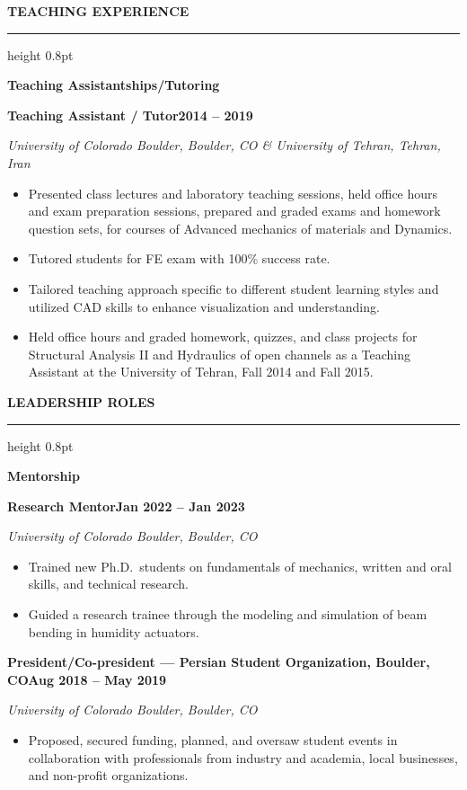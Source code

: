 \documentclass[10pt, letterpaper]{article}
\newcommand{\rsection}[1]{%
  \vspace{8pt}%
  {\large\bfseries\MakeUppercase{#1}}%
  \vspace{1pt}%
  \hrule height 0.8pt%
  \vspace{4pt}%
}
\newcommand{\jobline}[2]{%
  \vspace{5pt}%
  \noindent\textbf{#1}\hfill\textbf{#2}\par%
  \vspace{1pt}%
}
\newcommand{\subline}[1]{%
  \vspace{-1pt}%
  \noindent\textit{#1}\par%
  \vspace{1pt}%
}
\newenvironment{rlist}{%
  \begin{itemize}[leftmargin=1.4em, itemsep=1pt, topsep=2pt, parsep=0pt]%
}{%
  \end{itemize}%
}
\begin{document}
\rsection{Teaching Experience}

\noindent\textbf{Teaching Assistantships/Tutoring}

\jobline{Teaching Assistant / Tutor}{2014 -- 2019}
\subline{University of Colorado Boulder, Boulder, CO \& University of Tehran, Tehran, Iran}
\begin{rlist}
  \item Presented class lectures and laboratory teaching sessions, held office hours and exam preparation sessions, prepared and graded exams and homework question sets, for courses of Advanced mechanics of materials and Dynamics.
  \item Tutored students for FE exam with 100\% success rate.
  \item Tailored teaching approach specific to different student learning styles and utilized CAD skills to enhance visualization and understanding.
  \item Held office hours and graded homework, quizzes, and class projects for Structural Analysis II and Hydraulics of open channels as a Teaching Assistant at the University of Tehran, Fall 2014 and Fall 2015.
\end{rlist}

\rsection{Leadership Roles}

\noindent\textbf{Mentorship}

\jobline{Research Mentor}{Jan 2022 -- Jan 2023}
\subline{University of Colorado Boulder, Boulder, CO}
\begin{rlist}
  \item Trained new Ph.D.\ students on fundamentals of mechanics, written and oral skills, and technical research.
  \item Guided a research trainee through the modeling and simulation of beam bending in humidity actuators.
\end{rlist}

\jobline{President/Co-president --- Persian Student Organization, Boulder, CO}{Aug 2018 -- May 2019}
\subline{University of Colorado Boulder, Boulder, CO}
\begin{rlist}
  \item Proposed, secured funding, planned, and oversaw student events in collaboration with professionals from industry and academia, local businesses, and non-profit organizations.
\end{rlist}
\end{document}
